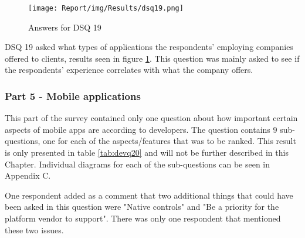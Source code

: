 \documentclass[a4paper,12pt]{article}
\renewcommand{\arraystretch}{1.5}
\begin{document}
\begin{figure}[ht!]
    \centering
    \texttt{[image: Report/img/Results/dsq19.png]}
    \caption{Answers for DSQ 19}
    \label{fig:res_devq19}
\end{figure}

DSQ 19 asked what types of applications the respondents' employing companies offered to clients, results seen in figure \ref{fig:res_devq19}. This question was mainly asked to see if the respondents' experience correlates with what the company offers.

\subsubsection{Part 5 - Mobile applications}
This part of the survey contained only one question about how important certain aspects of mobile apps are according to developers. The question contains 9 sub-questions, one for each of the aspects/features that was to be ranked. This result is only presented in table \ref{tab:devq20} and will not be further described in this Chapter. Individual diagrams for each of the sub-questions can be seen in Appendix C.

One respondent added as a comment that two additional things that could have been asked in this question were "Native controls" and "Be a priority for the platform vendor to support". There was only one respondent that mentioned these two issues.

\setlength{\parindent}{0pt}
\setlength{\arrayrulewidth}{0.4mm}
\setlength{\tabcolsep}{4pt}
\renewcommand{\arraystretch}{1.5}
\end{document}
